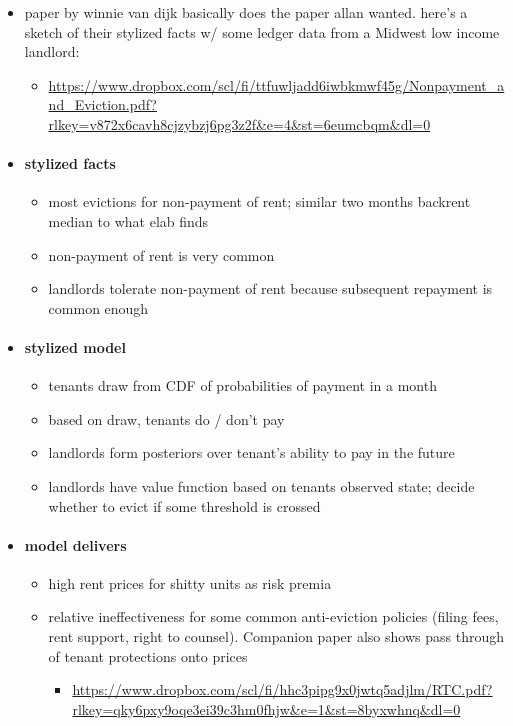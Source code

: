 \begin{itemize}
    \item paper by winnie van dijk basically does the paper allan wanted. here's a sketch of their stylized facts w/ some ledger data from a Midwest low income landlord: 
    \begin{itemize}
        \item \url{https://www.dropbox.com/scl/fi/ttfuwljadd6iwbkmwf45g/Nonpayment_and_Eviction.pdf?rlkey=v872x6cavh8cjzybzj6pg3z2f&e=4&st=6eumcbqm&dl=0}
    \end{itemize}
    
    \item \paragraph{stylized facts}
    \begin{itemize}
        \item most evictions for non-payment of rent; similar two months backrent median to what elab finds
        \item non-payment of rent is very common
        \item landlords tolerate non-payment of rent because subsequent repayment is common enough
    \end{itemize}
    \item \paragraph{stylized model}
    \begin{itemize}
        \item tenants draw from CDF of probabilities of payment in a month
        \item based on draw, tenants do / don't pay
        \item landlords form posteriors over tenant's ability to pay in the future
        \item landlords have value function based on tenants observed state;  decide whether to evict if some threshold is crossed
    \end{itemize}
    \item \paragraph{model delivers}
    \begin{itemize}
        \item high rent prices for shitty units as risk premia
        \item relative ineffectiveness for some common anti-eviction policies (filing fees, rent support, right to counsel). Companion paper also shows pass through of tenant protections onto prices
        \begin{itemize}
            \item \url{https://www.dropbox.com/scl/fi/hhc3pipg9x0jwtq5adjlm/RTC.pdf?rlkey=qky6pxy9oqe3ei39c3hm0fhjw&e=1&st=8byxwhnq&dl=0}
        \end{itemize}
    \end{itemize}
    
\end{itemize}

